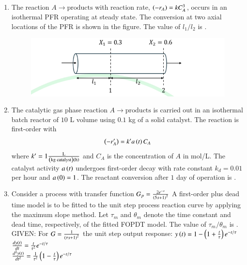 \documentclass[journal,12pt,onecolumn]{IEEEtran}
\theoremstyle{remark}
\begin{document}
\begin{enumerate}
		\hfill{}
		
		\item The reaction $A \rightarrow \text{products}$ with reaction rate, $\left(-r_A\right) = kC_A^3$, occurs in an isothermal PFR operating at steady state. The conversion  at two axial locations  of the PFR is shown in the figure. The value of $l_1/l_2$ is \underline{\hspace{2cm}} .
		\begin{figure}[h]
			\centering
			\includegraphics[width=0.6\columnwidth]{q58.png}
			\caption*{}
			\label{fig:q58}
		\end{figure}
		
		\hfill{}
		
		\item The catalytic gas phase reaction $A \rightarrow \text{products}$ is carried out in an isothermal batch reactor of $10$ L volume using $0.1$ kg of a solid catalyst. The reaction is first-order with
		\[ \left(-r'_A\right) = k'a\left(t\right)C_A \]
		where $k' = 1 \frac{\text{L}}{\left(\text{kg catalyst}\right)\left(\text{h}\right)}$ and $C_A$ is the concentration of $A$ in mol/L. The catalyst activity $a\left(t\right)$ undergoes first-order decay with rate constant $k_d = 0.01$ per hour and $a\left(0\right) = 1$. The reactant conversion after $1$ day of operation is \underline{\hspace{2cm}} .
		
		\hfill{}
		
		\item Consider a process with transfer function
	$ G_p = \frac{2e^{-s}}{\left(5s + 1\right)^2} $
		A first-order plus dead time  model is to be fitted to the unit step process reaction curve  by applying the maximum slope method. Let $\tau_m$ and $\theta_m$ denote the time constant and dead time, respectively, of the fitted FOPDT model. The value of $\tau_m / \theta_m$ is \underline{\hspace{2cm}} . \\
		GIVEN: For $G = \frac{1}{\left(\tau s + 1\right)^2}$
		the unit step output response: $y\left(t\right) = 1 - \left(1 + \frac{t}{\tau}\right)e^{-t/\tau}$ \\
		$\frac{dy\left(t\right)}{dt} = \frac{t}{\tau^2}e^{-t/\tau}$ \\
		$\frac{d^2y\left(t\right)}{dt^2} = \frac{1}{\tau^2}\left(1 - \frac{t}{\tau}\right)e^{-t/\tau}$
		

\end{enumerate}
\end{document}
